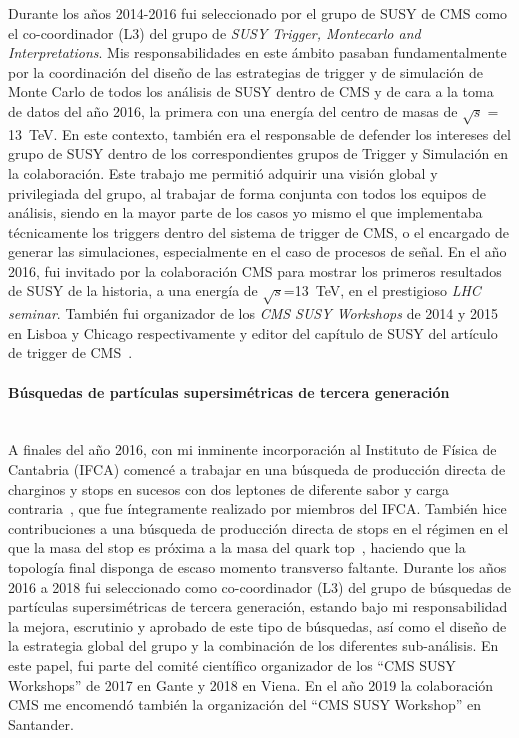 Durante los años 2014-2016 fui seleccionado por el grupo de SUSY de CMS como el co-coordinador (L3) del grupo de \emph{SUSY Trigger, Montecarlo and Interpretations}. Mis responsabilidades en este ámbito pasaban fundamentalmente por la coordinación del diseño de las estrategias de trigger y de simulación de Monte Carlo de todos los análisis de SUSY dentro de CMS y de cara a la toma de datos del año 2016, la primera con una energía del centro de masas de $\sqrt{s}=$ 13~TeV. En este contexto, también era el responsable de defender los intereses del grupo de SUSY dentro de los correspondientes grupos de Trigger y Simulación en la colaboración. Este trabajo me permitió adquirir una visión global y privilegiada del grupo, al trabajar de forma conjunta con todos los equipos de análisis, siendo en la mayor parte de los casos yo mismo el que implementaba técnicamente los triggers dentro del sistema de trigger de CMS, o el encargado de generar las simulaciones, especialmente en el caso de procesos de señal. En el año 2016, fui invitado por la colaboración CMS para mostrar los primeros resultados de SUSY de la historia, a una energía de $\sqrt{s}$=13~TeV, en el prestigioso \emph{LHC seminar}. También fui organizador de los \emph{CMS SUSY Workshops} de 2014 y 2015 en Lisboa y Chicago respectivamente y editor del capítulo de SUSY del artículo de trigger de CMS~\cite{Trigger}.


\paragraph{Búsquedas de partículas supersimétricas de tercera generación\\\\}

A finales del año 2016, con mi inminente incorporación al Instituto de Física de Cantabria (IFCA) comencé a trabajar en una búsqueda de producción directa de charginos y stops en sucesos con dos leptones de diferente sabor y carga contraria~\cite{Luca}, que fue íntegramente realizado por miembros del IFCA. También hice contribuciones a una búsqueda de producción directa de stops en el régimen en el que la masa del stop es próxima a la masa del quark top~\cite{Oviedo}, haciendo que la topología final disponga de escaso momento transverso faltante. Durante los años 2016 a 2018 fui seleccionado como co-coordinador (L3) del grupo de búsquedas de partículas supersimétricas de tercera generación, estando bajo mi responsabilidad la mejora, escrutinio y aprobado de este tipo de búsquedas, así como el diseño de la estrategia global del grupo y la combinación de los diferentes sub-análisis. En este papel, fui parte del comité científico organizador de los “CMS SUSY Workshops” de  2017 en Gante y 2018 en Viena. En el año 2019 la colaboración CMS me encomendó también la organización del “CMS SUSY Workshop” en Santander.


